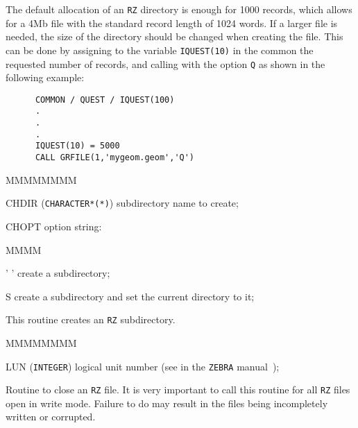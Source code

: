 The default allocation of an {\tt RZ} directory is enough for 1000 records,
which allows for a 4Mb file with the standard record length of 1024 words. 
If a larger file is needed, the size of the directory should be changed 
when creating the file. This can be done by assigning to the variable
{\tt IQUEST(10)} in the common  the requested number of records,
and calling  with the option {\tt Q} as shown in the following
example:
\begin{verbatim}
      COMMON / QUEST / IQUEST(100)
      .
      .
      .
      IQUEST(10) = 5000
      CALL GRFILE(1,'mygeom.geom','Q')
\end{verbatim}


\begin{DLtt}{MMMMMMMM}
\item[CHDIR] ({\tt CHARACTER*(*)}) subdirectory name to create;
\item[CHOPT] option string:
\begin{DLtt}{MMMM}
\item[' '] create a subdirectory;
\item[S] create a subdirectory and set the current directory to it;
\end{DLtt}
\end{DLtt}
This routine creates an {\tt RZ} subdirectory.

\begin{DLtt}{MMMMMMMM}
\item[LUN] ({\tt INTEGER}) logical unit number (see  in
the {\tt ZEBRA} manual~\cite{bib-ZEBRA});
\end{DLtt}
 
Routine to close an {\tt RZ} file. It is very important to call this
routine for all {\tt RZ} files open in write mode. Failure to do may
result in the files being incompletely written or corrupted.
